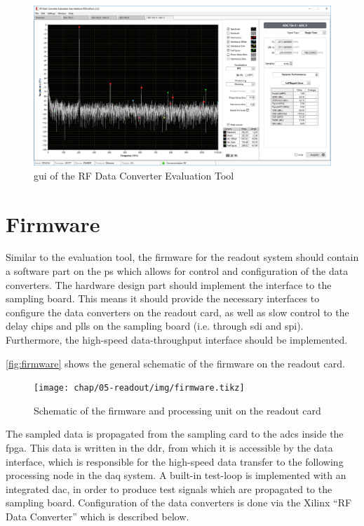 \begin{figure}[tb]
	\centering
	\includegraphics[width = \textwidth]{chap/05-readout/img/evaltool}
	\caption{\gls{gui} of the RF Data Converter Evaluation Tool}
	\label{fig:gui}
\end{figure}

\section{Firmware}\label{sec:firmware}
Similar to the evaluation tool, the firmware for the readout system should contain a software part on the \gls{ps} which allows for control and configuration of the data converters. 
The hardware design part should implement the interface to the sampling board. 
This means it should provide the necessary interfaces to configure the data converters on the readout card, as well as slow control to the delay chips and \glspl{pll} on the sampling board (i.e. through \gls{sdi} and \gls{spi}). 
Furthermore, the high-speed data-throughput interface should be implemented.

\autoref{fig:firmware} shows the general schematic of the firmware on the readout card.
\begin{figure}[tb]
	\centering
	\texttt{[image: chap/05-readout/img/firmware.tikz]}
	\caption{Schematic of the firmware and processing unit on the readout card}
	\label{fig:firmware}
\end{figure}

The sampled data is propagated from the sampling card to the \glspl{adc} inside the \gls{fpga}. 
This data is written in the \gls{ddr}, from which it is accessible by the data interface, which is responsible for the high-speed data transfer to the following processing node in the \gls{daq} system.
A built-in test-loop is implemented with an integrated \gls{dac}, in order to produce test signals which are propagated to the sampling board.
Configuration of the data converters is done via the Xilinx ``RF Data Converter'' which is described below. 

